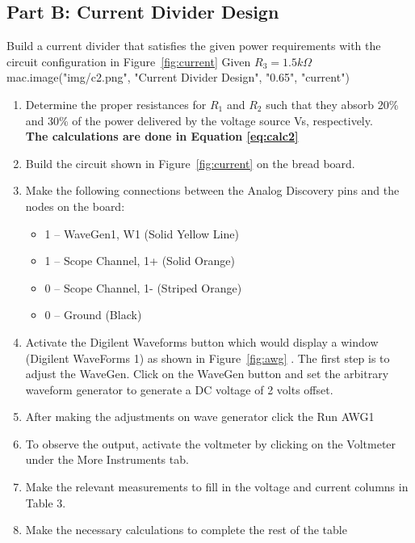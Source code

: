 {\subsection{Part B: Current Divider Design}
\label{sub:Procedure Part B}
Build a current divider that satisfies the given power requirements with the circuit
configuration in Figure~\ref{fig:current} Given $R_3 = 1.5 k\Omega$
{{ mac.image("img/c2.png", "Current Divider Design", "0.65", "current")}}
\begin{enumerate}
  \item Determine the proper resistances for $R_1$ and $R_2$ such that they absorb 20\% and 30\% of
  the power delivered by the voltage source Vs, respectively.\\
  \textbf{The calculations are done in Equation \ref{eq:calc2}}
  \item Build the circuit shown in Figure~\ref{fig:current}  on the bread board.
  \item Make the following connections between the Analog Discovery pins and the nodes on the
  board:
  \begin{itemize}
    \item 1 – WaveGen1, W1 (Solid Yellow Line)
    \item 1 – Scope Channel, 1+ (Solid Orange)
    \item 0 – Scope Channel, 1- (Striped Orange)
    \item 0 – Ground (Black)
  \end{itemize}
  \item Activate the Digilent Waveforms button which would display a window (Digilent
  WaveForms 1) as shown in Figure~\ref{fig:awg} . The first step is to adjust the WaveGen. Click on
  the WaveGen button and set the arbitrary waveform generator to generate a DC voltage
  of 2 volts offset.
  \item After making the adjustments on wave generator click the Run AWG1
  \item To observe the output, activate the voltmeter by clicking on the Voltmeter under the
  More Instruments tab.
  \item Make the relevant measurements to fill in the voltage and current columns in Table 3.
  \item Make the necessary calculations to complete the rest of the table
\end{enumerate}

}
